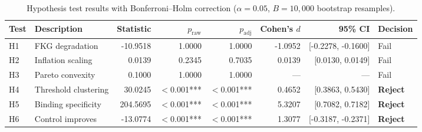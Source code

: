 \begin{table}[htbp]
\centering
\caption{Hypothesis test results with Bonferroni--Holm correction ($\alpha = 0.05$, $B = 10{,}000$ bootstrap resamples).}
\label{tab:hypothesis}
\small
\begin{tabular}{@{}llrrrrrl@{}}
\toprule
Test & Description & Statistic & $p_{\mathrm{raw}}$ & $p_{\mathrm{adj}}$ & Cohen's $d$ & 95\% CI & Decision \\
\midrule
  H1 & FKG degradation & -10.9518 & 1.0000 & 1.0000 & -1.0952 & [-0.2278, -0.1600] & Fail \\
  H2 & Inflation scaling & 0.0139 & 0.2345 & 0.7035 & 0.0139 & [0.0130, 0.0149] & Fail \\
  H3 & Pareto convexity & 0.1000 & 1.0000 & 1.0000 & --- & --- & Fail \\
  H4 & Threshold clustering & 30.0245 & $<$0.001*** & $<$0.001*** & 0.4652 & [0.3863, 0.5430] & \textbf{Reject} \\
  H5 & Binding specificity & 204.5695 & $<$0.001*** & $<$0.001*** & 5.3207 & [0.7082, 0.7182] & \textbf{Reject} \\
  H6 & Control improves & -13.0774 & $<$0.001*** & $<$0.001*** & 1.3077 & [-0.3187, -0.2371] & \textbf{Reject} \\
\bottomrule
\end{tabular}
\end{table}
